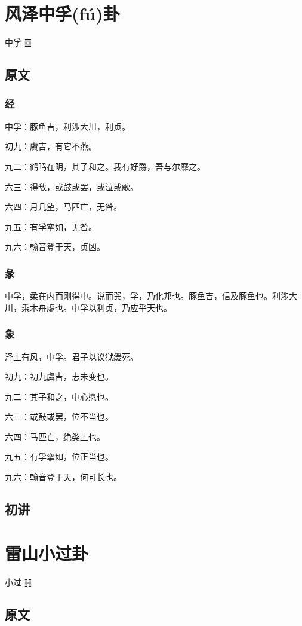 \documentclass[12pt,oneside]{book}
\begin{document}
\chapter{风泽中孚(fú)卦}
中孚 {\LARGE ䷼}


\section{原文}

\subsection{经}
中孚：豚鱼吉，利涉大川，利贞。

初九：虞吉，有它不燕。

九二：鹤鸣在阴，其子和之。我有好爵，吾与尔靡之。

六三：得敌，或鼓或罢，或泣或歌。

六四：月几望，马匹亡，无咎。

九五：有孚挛如，无咎。

九六：翰音登于天，贞凶。

\subsection{彖}
中孚，柔在内而刚得中。说而巽，孚，乃化邦也。豚鱼吉，信及豚鱼也。利涉大川，乘木舟虚也。中孚以利贞，乃应乎天也。

\subsection{象}
泽上有风，中孚。君子以议狱缓死。

初九：初九虞吉，志未变也。

九二：其子和之，中心愿也。

六三：或鼓或罢，位不当也。

六四：马匹亡，绝类上也。

九五：有孚挛如，位正当也。

九六：翰音登于天，何可长也。

\section{初讲}


\chapter{雷山小过卦}
小过 {\LARGE ䷽}

\section{原文}
\end{document}

